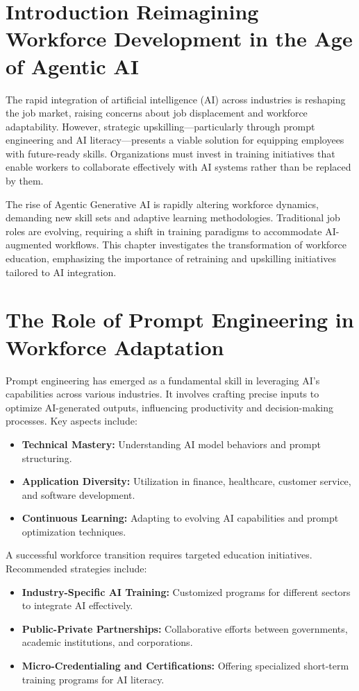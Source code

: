 \documentclass[a4paper,headinclude=on,footinclude=on,12pt,oneside]{scrbook}
\begin{document}
\section{Introduction Reimagining Workforce Development in the Age of Agentic AI}
The rapid integration of artificial intelligence (AI) across industries is reshaping the job market, raising concerns about job displacement and workforce adaptability. However, strategic upskilling—particularly through prompt engineering and AI literacy—presents a viable solution for equipping employees with future-ready skills. Organizations must invest in training initiatives that enable workers to collaborate effectively with AI systems rather than be replaced by them.





The rise of Agentic Generative AI is rapidly altering workforce dynamics, demanding new skill sets and adaptive learning methodologies. Traditional job roles are evolving, requiring a shift in training paradigms to accommodate AI-augmented workflows. This chapter investigates the transformation of workforce education, emphasizing the importance of retraining and upskilling initiatives tailored to AI integration.

\section{The Role of Prompt Engineering in Workforce Adaptation}

Prompt engineering has emerged as a fundamental skill in leveraging AI’s capabilities across various industries. It involves crafting precise inputs to optimize AI-generated outputs, influencing productivity and decision-making processes. Key aspects include:
\begin{itemize}
	\item \textbf{Technical Mastery:} Understanding AI model behaviors and prompt structuring.
	\item \textbf{Application Diversity:} Utilization in finance, healthcare, customer service, and software development.
	\item \textbf{Continuous Learning:} Adapting to evolving AI capabilities and prompt optimization techniques.
\end{itemize}


A successful workforce transition requires targeted education initiatives. Recommended strategies include:
\begin{itemize}
	\item \textbf{Industry-Specific AI Training:} Customized programs for different sectors to integrate AI effectively.
	\item \textbf{Public-Private Partnerships:} Collaborative efforts between governments, academic institutions, and corporations.
	\item \textbf{Micro-Credentialing and Certifications:} Offering specialized short-term training programs for AI literacy.
\end{itemize}
\end{document}
